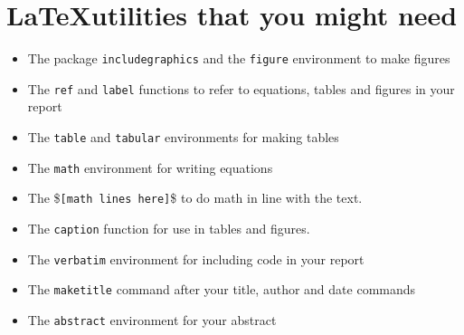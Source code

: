\documentclass[12pt]{article}
\begin{document}
\section*{\LaTeX utilities that you might need}
\begin{itemize}
  \item{The package {\tt includegraphics} and the {\tt figure} environment to make figures}
  \item{The {\tt ref} and {\tt label} functions to refer to equations, tables and figures in your report}
  \item{The {\tt table} and {\tt tabular} environments for making tables}
  \item{The {\tt math} environment for writing equations}
  \item{The \${\tt [math lines here]}\$ to do math in line with the text.}
  \item{The {\tt caption} function for use in tables and figures.}
  \item{The {\tt verbatim} environment for including code in your report}
  \item{The {\tt maketitle} command after your title, author and date commands}
  \item{The {\tt abstract} environment for your abstract}
\end{itemize}
\end{document}
